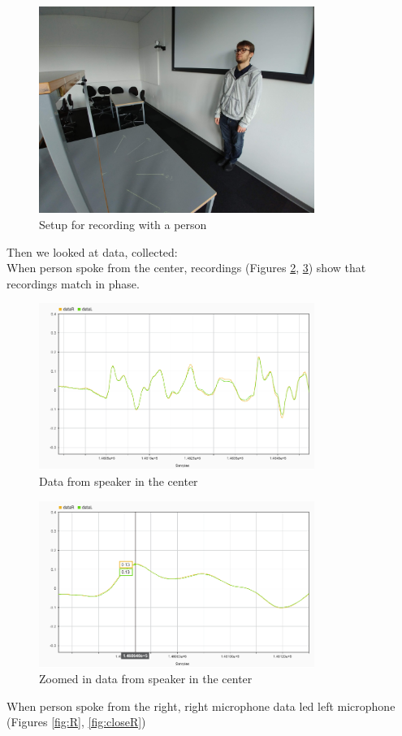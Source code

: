 \begin{figure}[htp]
	\centering
	\includegraphics[width=0.8\textwidth]{Illustrations/razvanWithSetup.jpg}
	\caption{Setup for recording with a person}
	\label{fig:RanzvanRecSetup}
\end{figure}

Then we looked at data, collected:\\
When person spoke from the center, recordings (Figures  \ref{fig:C}, \ref{fig:closeC}) show that recordings 
match in phase.\\

\begin{figure}[htp]
	\centering
	\includegraphics[width=0.8\textwidth]{Illustrations/DataC.png}
	\caption{Data from speaker in the center}
	\label{fig:C}
\end{figure}

\begin{figure}[htp]
	\centering
	\includegraphics[width=0.8\textwidth]{Illustrations/DataC_with_Markers.png}
	\caption{Zoomed in data from speaker in the center}
	\label{fig:closeC}
\end{figure}
When person spoke from the right, right microphone data led left microphone (Figures  
\ref{fig:R}, \ref{fig:closeR})\\


